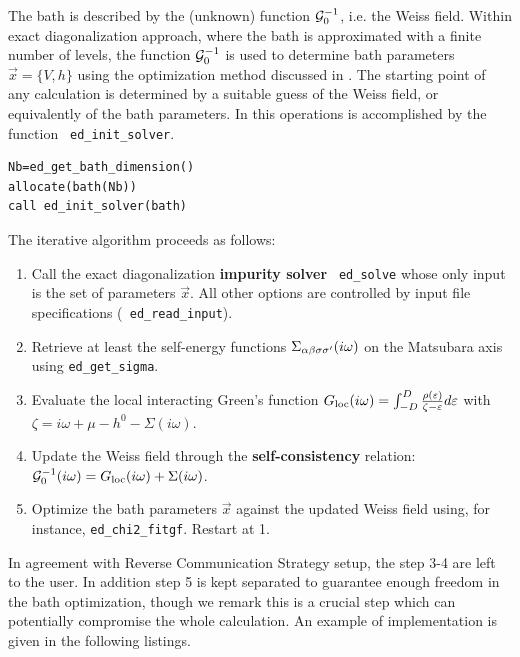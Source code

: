 \documentclass[edipack2.tex]{subfiles}
\begin{document}
The bath is described
by the (unknown) function ${\cal G}^{-1}_0$, i.e. the Weiss field. Within \NAME
exact diagonalization approach, where the bath is approximated with a
finite number of levels, the function ${\cal G}^{-1}_0$ is used to
determine bath parameters $\vec{x}=\{V,h\}$ using the optimization method discussed in
.
The starting point of any calculation is determined by a suitable
guess of the Weiss field, or equivalently of the bath parameters.
In \NAME this operations is accomplished by the function {\tt
  ed\_init\_solver}.

\begin{lstlisting}[style=fstyle,numbers=none,basicstyle={\scriptsize\ttfamily}]
Nb=ed_get_bath_dimension()
allocate(bath(Nb))
call ed_init_solver(bath)
\end{lstlisting}








The iterative algorithm proceeds as follows:
\begin{enumerate}
\item Call the exact diagonalization {\bf impurity solver} {\tt
    ed\_solve} whose only input is the set of parameters $\vec{x}$. All other
  options are controlled by input file specifications ({\tt
    ed\_read\_input}).
\item Retrieve at least the self-energy functions $\Sigma_{\alpha\beta\sigma\sigma'}(i\omega)$ on the
  Matsubara axis using {\tt ed\_get\_sigma}.
\item Evaluate the local interacting Green's function
  $G_\mathrm{loc}(i\omega) = \int_{-D}^D \frac{\rho(\varepsilon)}{\zeta -\varepsilon}d\varepsilon$ with
  $\zeta=i\omega+\mu-h^0-\Sigma(i\omega)$.
  \item Update the Weiss field through the {\bf self-consistency}
    relation: ${\cal G}^{-1}_0(i\omega) = G_\mathrm{loc}(i\omega) + \Sigma(i\omega)$. 
  \item Optimize the bath parameters $\vec{x}$ against the updated
    Weiss field using, for instance, {\tt ed\_chi2\_fitgf}. Restart at 1.
\end{enumerate}
In agreement with Reverse Communication Strategy setup, the step 3-4
are left to the user. In addition step 5 is kept separated to
guarantee enough freedom in the bath optimization, though we remark
this is a crucial step which can potentially compromise the whole
calculation.
An example of implementation is given in the following listings.
\end{document}
